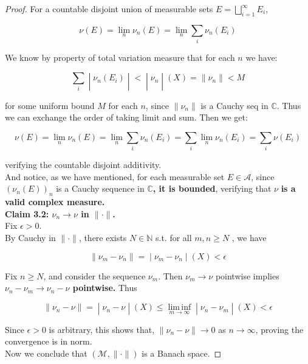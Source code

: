 \documentclass{qlnotes-export}
\begin{document}
\begin{proof}
For a countable disjoint union of measurable sets \(E = \bigsqcup_{i = 1}^{\infty}E_{i}\),

\[\nu(E) = \lim\limits_{n}\nu_{n}(E) = \lim\limits_{n}\sum\limits_{i}\nu_{n}(E_{i})\]

We know by property of total variation measure that for each \(n\) we have:

\[\left. \sum\limits_{i} \middle| \nu_{n}(E_{i}) \middle| < \middle| \nu_{n} \middle| (X) = \parallel \nu_{n} \parallel < M \right.\]

for some uniform bound \(M\) for each \(n\), since \(\parallel \nu_{n} \parallel\) is a Cauchy seq in \(\mathbb{C}\). Thus we can exchange the order of taking limit and sum. Then we get:

\[\nu(E) = \lim\limits_{n}\nu_{n}(E) = \lim\limits_{n}\sum\limits_{i}\nu_{n}(E_{i}) = \sum\limits_{i}\lim\limits_{n}\nu_{n}(E_{i}) = \sum\limits_{i}\nu(E_{i})\]

verifying the countable disjoint additivity.\\
And notice, as we have mentioned, for each measurable set \(E \in \mathcal{A}\), since \((\nu_{n}(E))_{n}\) is a Cauchy sequence in \(\mathbb{C}\)\textbf{, it is bounded}, verifying that \(\nu\) \textbf{is a valid complex measure.}\\
\textbf{Claim 3.2: \(\nu_{n}\rightarrow\nu\) in \(\parallel \cdot \parallel\).}\\
Fix \(\epsilon > 0\).\\
By Cauchy in \(\parallel \cdot \parallel\), there exists \(N \in {\mathbb{N}}\) s.t. for all \(m,n \geq N\) , we have

\[\left. \parallel \nu_{m} - \nu_{n} \parallel = \middle| \nu_{m} - \nu_{n} \middle| (X) < \epsilon \right.\]

Fix \(n \geq N\), and consider the sequence \(\nu_{m}\). Then \(\nu_{m}\rightarrow\nu\) pointwise implies \textbf{\(\nu_{n} - \nu_{m}\rightarrow\nu_{n} - \nu\) pointwise.} Thus

\[\left. \parallel \nu_{n} - \nu \parallel = \middle| \nu_{n} - \nu \middle| (X) \leq \operatorname{lim\, inf}\limits_{m\rightarrow\infty} \middle| \nu_{n} - \nu_{m} \middle| (X) < \epsilon \right.\]

Since \(\epsilon > 0\) is arbitrary, this shows that, \(\parallel \nu_{n} - \nu \parallel \rightarrow 0\) as \(n\rightarrow\infty\), proving the convergence is in norm.\\
Now we conclude that \((\mathcal{M}, \parallel \cdot \parallel )\) is a Banach space.

\end{proof}
\end{document}
